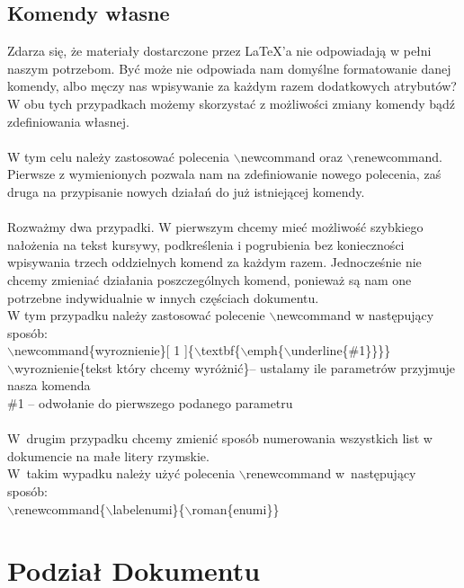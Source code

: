 \documentclass[a4paper, 12pt]{article}
\begin{document}
\subsection{Komendy własne}
Zdarza się, że materiały dostarczone przez \LaTeX 'a nie odpowiadają w pełni naszym potrzebom. Być może nie odpowiada nam domyślne formatowanie danej komendy, albo męczy nas wpisywanie za każdym razem dodatkowych atrybutów? W obu tych przypadkach możemy skorzystać z możliwości zmiany komendy bądź zdefiniowania własnej.\\
\\
W tym celu należy zastosować polecenia $\backslash$newcommand oraz $\backslash$renewcommand. Pierwsze z wymienionych pozwala nam na zdefiniowanie nowego polecenia, zaś druga na przypisanie nowych działań do już istniejącej komendy.\\
\\
Rozważmy dwa przypadki. W pierwszym chcemy mieć możliwość szybkiego nałożenia na tekst kursywy, podkreślenia i pogrubienia bez konieczności wpisywania trzech oddzielnych komend za każdym razem. Jednocześnie nie chcemy zmieniać działania poszczególnych komend, ponieważ są nam one potrzebne indywidualnie w innych częściach dokumentu. \\
W tym przypadku należy zastosować polecenie $\backslash$newcommand w następujący sposób:\\
$\backslash$newcommand\{wyroznienie\}[ 1 ]\{$\backslash$textbf\{$\backslash$emph\{$\backslash$underline\{\#1\}\}\}\}\\
$\backslash$wyroznienie\{tekst który chcemy wyróżnić\}\newline 
[ 1 ] -- ustalamy ile parametrów przyjmuje nasza komenda\\
\#1 -- odwołanie do pierwszego podanego parametru\\
\\
W~drugim przypadku chcemy zmienić sposób numerowania wszystkich list w dokumencie na małe litery rzymskie.\\
W~takim wypadku należy użyć polecenia $\backslash$renewcommand w~następujący sposób:\\
$\backslash$renewcommand\{$\backslash$labelenumi\}\{$\backslash$roman\{enumi\}\} \\

\section{Podział Dokumentu}
\end{document}
